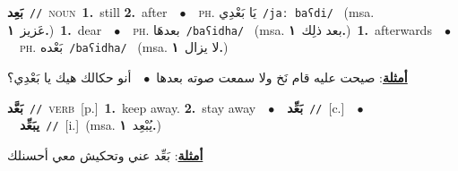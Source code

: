 \documentclass[10pt,a4paper,twoside]{article} %
\begin{document}
\begin{multicols}{2}
{\setlength\topsep{0pt}\textbf{\foreignlanguage{arabic}{بَعِد}}\ {\color{gray}\texttt{//}\color{black}}\ \textsc{noun}\ \textbf{1.}~still  \textbf{2.}~after\ \ $\bullet$\ \ \textsc{ph.} \color{gray} \foreignlanguage{arabic}{يَا بَعْدِي}\color{black}\ {\color{gray}\texttt{/{\sffamily jaː baʕdi}/}\color{black}}\ \color{gray} (msa. \foreignlanguage{arabic}{عَزيز}~\foreignlanguage{arabic}{\textbf{١.}})\color{black}\ \textbf{1.}~dear\ \ $\bullet$\ \ \textsc{ph.} \color{gray} \foreignlanguage{arabic}{بعدهَا}\color{black}\ {\color{gray}\texttt{/{\sffamily baʕidha}/}\color{black}}\ \color{gray} (msa. \foreignlanguage{arabic}{بعد ذلِك}~\foreignlanguage{arabic}{\textbf{١.}})\color{black}\ \textbf{1.}~afterwards\ \ $\bullet$\ \ \textsc{ph.} \color{gray} \foreignlanguage{arabic}{بَعْده}\color{black}\ {\color{gray}\texttt{/{\sffamily baʕidha}/}\color{black}}\ \color{gray} (msa. \foreignlanguage{arabic}{لا يزال}~\foreignlanguage{arabic}{\textbf{١.}})\color{black}\  \begin{flushright}\color{gray}\foreignlanguage{arabic}{\textbf{\underline{\foreignlanguage{arabic}{أمثلة}}}: صيحت عليه قام نَخ ولا سمعت صوته بعدها\ $\bullet$\ \  أنو حكالك هيك يا بَعْدِي؟}\end{flushright}\color{black}} \vspace{2mm}

{\setlength\topsep{0pt}\textbf{\foreignlanguage{arabic}{بَعَّد}}\ {\color{gray}\texttt{//}\color{black}}\ \textsc{verb}\ [p.]\ \textbf{1.}~keep away.  \textbf{2.}~stay away\ \ $\bullet$\ \ \setlength\topsep{0pt}\textbf{\foreignlanguage{arabic}{بَعِّد}}\ {\color{gray}\texttt{//}\color{black}}\ [c.]\ \ $\bullet$\ \ \setlength\topsep{0pt}\textbf{\foreignlanguage{arabic}{يبَعِّد}}\ {\color{gray}\texttt{//}\color{black}}\ [i.]\ \color{gray}(msa. \foreignlanguage{arabic}{يُبْعِد}~\foreignlanguage{arabic}{\textbf{١.}})\color{black}\  \begin{flushright}\color{gray}\foreignlanguage{arabic}{\textbf{\underline{\foreignlanguage{arabic}{أمثلة}}}: بَعِّد عني وتحكيش معي أحسنلك}\end{flushright}\color{black}} \vspace{2mm}


\end{multicols}
\end{document}

